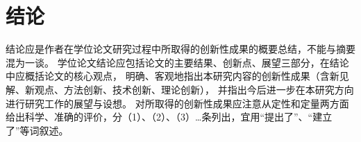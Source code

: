 
\chapter*{结\quad 论}



结论应是作者在学位论文研究过程中所取得的创新性成果的概要总结，不能与摘要混为一谈。
学位论文结论应包括论文的主要结果、创新点、展望三部分，在结论中应概括论文的核心观点，
明确、客观地指出本研究内容的创新性成果（含新见解、新观点、方法创新、技术创新、理论创新），
并指出今后进一步在本研究方向进行研究工作的展望与设想。
对所取得的创新性成果应注意从定性和定量两方面给出科学、准确的评价，分（1）、（2）、（3）…条列出，宜用“提出了”、“建立了”等词叙述。



